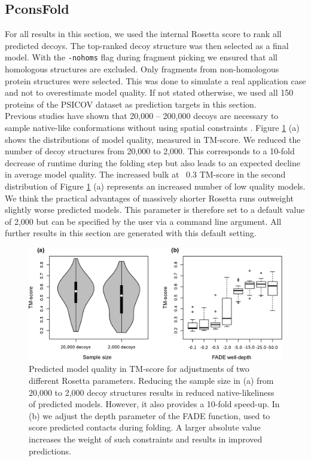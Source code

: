 \documentclass{bioinfo}
\begin{document}
\subsection{PconsFold}
For all results in this section, we used the internal Rosetta score to rank all predicted decoys. The top-ranked decoy structure was then selected as a final model. With the {\tt -nohoms} flag during fragment picking we ensured that all homologous structures are excluded. Only fragments from non-homologous protein structures were selected. This was done to simulate a real application case and not to overestimate model quality. If not stated otherwise, we used all 150 proteins of the PSICOV dataset as prediction targets in this section. \\\indent
Previous studies have shown that 20,000 -- 200,000 decoys are necessary to sample native-like conformations without using spatial constraints \cite[]{rosetta@home, rosetta_folding}. Figure \ref{fig:ros} (a) shows the distributions of model quality, measured in TM-score. We reduced the number of decoy structures from 20,000 to 2,000. This corresponds to a 10-fold decrease of runtime during the folding step but also leads to an expected decline in average model quality.  The increased bulk at ~0.3 TM-score in the second distribution of Figure \ref{fig:ros} (a) represents an increased number of low quality models. We think the practical advantages of massively shorter Rosetta runs outweight slightly worse predicted models. This parameter is therefore set to a default value of 2,000 but can be specified by the user via a command line argument. All further results in this section are generated with this default setting. \\\indent
\begin{figure}[!tpb]%
    \centerline{\includegraphics[scale=0.35]{figures/rosetta.eps}}
\caption{Predicted model quality in TM-score for adjustments of two different Rosetta parameters. Reducing the sample size in (a) from 20,000 to 2,000 decoy structures results in reduced native-likeliness of predicted models. However, it also provides a 10-fold speed-up. In (b) we adjust the depth parameter of the FADE function, used to score predicted contacts during folding. A larger absolute value increases the weight of such constraints and results in improved predictions.}\label{fig:ros}
\end{figure}
\end{document}
